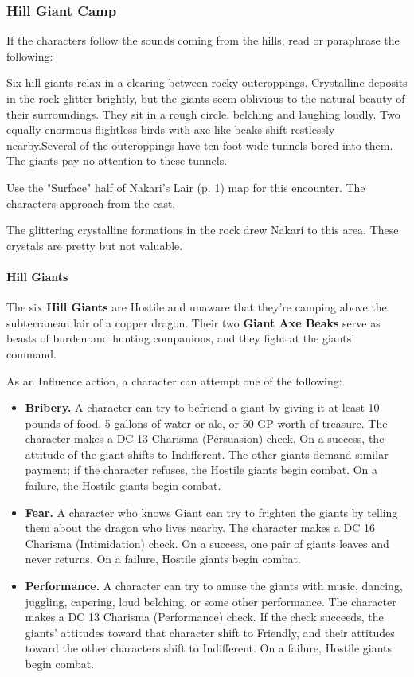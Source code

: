 \documentclass[letterpaper, 11pt, twocolumn]{dndbook}
\begin{document}
\subsubsection{Hill Giant Camp}

If the characters follow the sounds coming from the hills, read or paraphrase the following:

\begin{DndReadAloud}
Six hill giants relax in a clearing between rocky outcroppings. Crystalline deposits in the rock glitter brightly, but the giants seem oblivious to the natural beauty of their surroundings. They sit in a rough circle, belching and laughing loudly. Two equally enormous flightless birds with axe-like beaks shift restlessly nearby.Several of the outcroppings have ten-foot-wide tunnels bored into them. The giants pay no attention to these tunnels.
\end{DndReadAloud}

Use the "Surface" half of Nakari's Lair (p. 1) map for this encounter. The characters approach from the east.

The glittering crystalline formations in the rock drew Nakari to this area. These crystals are pretty but not valuable.

\paragraph{Hill Giants}

The six \textbf{Hill Giants} are Hostile and unaware that they're camping above the subterranean lair of a copper dragon. Their two \textbf{Giant Axe Beaks} serve as beasts of burden and hunting companions, and they fight at the giants' command.

As an Influence action, a character can attempt one of the following:

\begin{itemize}
\item \textbf{Bribery.} A character can try to befriend a giant by giving it at least 10 pounds of food, 5 gallons of water or ale, or 50 GP worth of treasure. The character makes a DC 13 Charisma (Persuasion) check. On a success, the attitude of the giant shifts to Indifferent. The other giants demand similar payment; if the character refuses, the Hostile giants begin combat. On a failure, the Hostile giants begin combat.
\item \textbf{Fear.} A character who knows Giant can try to frighten the giants by telling them about the dragon who lives nearby. The character makes a DC 16 Charisma (Intimidation) check. On a success, one pair of giants leaves and never returns. On a failure, Hostile giants begin combat.
\item \textbf{Performance.} A character can try to amuse the giants with music, dancing, juggling, capering, loud belching, or some other performance. The character makes a DC 13 Charisma (Performance) check. If the check succeeds, the giants' attitudes toward that character shift to Friendly, and their attitudes toward the other characters shift to Indifferent. On a failure, Hostile giants begin combat.
\end{itemize}
\end{document}
